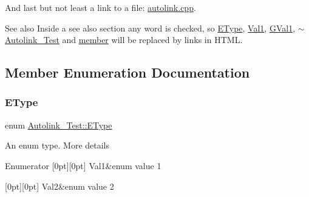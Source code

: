 And last but not least a link to a file\+: \mbox{\hyperlink{autolink_8cpp}{autolink.\+cpp}}.

\begin{DoxySeeAlso}{See also}
Inside a see also section any word is checked, so \mbox{\hyperlink{class_autolink___test_aeb611627c332d067bded1806b1bb45c2}{E\+Type}}, \mbox{\hyperlink{class_autolink___test_aeb611627c332d067bded1806b1bb45c2af70631e295bce280e74762d18af47a94}{Val1}}, \mbox{\hyperlink{autolink_8cpp_a656d63cf384d2a6f23c2c18523a7bc5ea0f016f49e4f3bcd072319b9d68bc927d}{G\+Val1}}, \mbox{\hyperlink{class_autolink___test_a03bf46c8e2b733680035f524fd7b193b}{$\sim$\+Autolink\+\_\+\+Test}} and \mbox{\hyperlink{class_autolink___test_a393ea281f235a2f603d98daf72b0d411}{member}} will be replaced by links in H\+T\+ML. 
\end{DoxySeeAlso}


\subsection{Member Enumeration Documentation}
\mbox{\label{class_autolink___test_aeb611627c332d067bded1806b1bb45c2}} 
\subsubsection{\texorpdfstring{EType}{EType}}
{\footnotesize\ttfamily enum \mbox{\hyperlink{class_autolink___test_aeb611627c332d067bded1806b1bb45c2}{Autolink\+\_\+\+Test\+::\+E\+Type}}}

An enum type. More details \begin{DoxyEnumFields}{Enumerator}
[0pt][0pt]{}\mbox{\label{class_autolink___test_aeb611627c332d067bded1806b1bb45c2af70631e295bce280e74762d18af47a94}} 
Val1&enum value 1 \\
\hline

[0pt][0pt]{}\mbox{\label{class_autolink___test_aeb611627c332d067bded1806b1bb45c2a7d760f44a8971559d108a609b8fb9b3b}} 
Val2&enum value 2 \\
\hline

\end{DoxyEnumFields}


